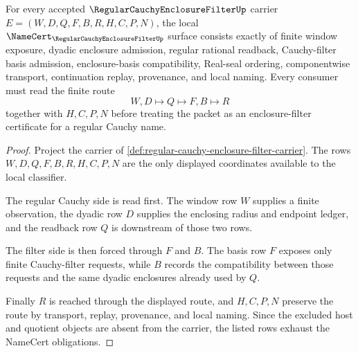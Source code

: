 \begin{theorem}
\label{thm:regular-cauchy-enclosure-filter-namecert-obligations}
For every accepted $\RegularCauchyEnclosureFilterUp$ carrier $E=(W,D,Q,F,B,R,H,C,P,N)$, the local $\NameCert_{\RegularCauchyEnclosureFilterUp}$ surface consists exactly of finite window exposure, dyadic enclosure admission, regular rational readback, Cauchy-filter basis admission, enclosure-basis compatibility, Real-seal ordering, componentwise transport, continuation replay, provenance, and local naming. Every consumer must read the finite route
$$
W,D \longmapsto Q \longmapsto F,B \longmapsto R
$$
together with $H,C,P,N$ before treating the packet as an enclosure-filter certificate for a regular Cauchy name.
\end{theorem}
\begin{proof}
Project the carrier of \autoref{def:regular-cauchy-enclosure-filter-carrier}. The rows $W,D,Q,F,B,R,H,C,P,N$ are the only displayed coordinates available to the local classifier.

The regular Cauchy side is read first. The window row $W$ supplies a finite observation, the dyadic row $D$ supplies the enclosing radius and endpoint ledger, and the readback row $Q$ is downstream of those two rows.

The filter side is then forced through $F$ and $B$. The basis row $F$ exposes only finite Cauchy-filter requests, while $B$ records the compatibility between those requests and the same dyadic enclosures already used by $Q$.

Finally $R$ is reached through the displayed route, and $H,C,P,N$ preserve the route by transport, replay, provenance, and local naming. Since the excluded host and quotient objects are absent from the carrier, the listed rows exhaust the NameCert obligations.
\end{proof}

